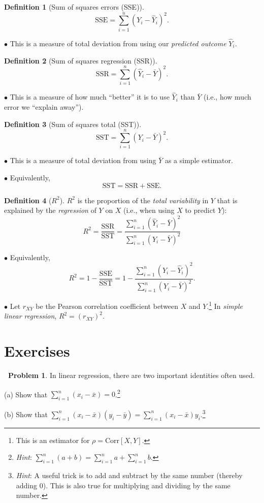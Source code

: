 \documentclass[12pt,oneside]{article}
\newcommand{\Corr}{\text{Corr}}
\newcommand{\SSE}{\text{SSE}}
\newcommand{\SST}{\text{SST}}
\newcommand{\SSR}{\text{SSR}}
\theoremstyle{definition}
\newtheorem{definition}{Definition}
\newtheorem{problem}{\faPen \ Problem}
\theoremstyle{remark}
\begin{document}
\begin{definition}[Sum of squares errors (SSE)]
\[\SSE = \sum_{i = 1}^{n} (Y_i - \hat{Y}_i)^2.\]

$\bullet$ This is a measure of total deviation from using our \textit{predicted outcome} $\hat{Y}_i$.
\end{definition}

\begin{definition}[Sum of squares regression (SSR)]
\[\SSR = \sum_{i = 1}^{n} (\hat{Y}_i - \bar{Y})^2.\]

$\bullet$ This is a measure of how much \enquote{better} it is to use $\hat{Y}_i$ than $\bar{Y}$ (i.e., how much error we \enquote{explain away}).
\end{definition}

\begin{definition}[Sum of squares total (SST)]
\[\SST = \sum_{i = 1}^{n} (Y_i - \bar{Y})^2.\]

$\bullet$ This is a measure of total deviation from using $\bar{Y}$ as a simple estimator.

$\bullet$ Equivalently, \[\SST = \SSR + \SSE.\]
\end{definition}

\begin{definition}[$R^2$]
$R^2$ is the proportion of the \textit{total variability} in $Y$ that is explained by the \textit{regression} of $Y$ on $X$ (i.e., when using $X$ to predict $Y$): \[R^2 = \frac{\SSR}{\SST} = \frac{\sum_{i = 1}^{n} (\hat{Y}_i - \bar{Y})^2}{\sum_{i = 1}^{n} (Y_i - \bar{Y})^2}\]

$\bullet$ Equivalently, \[R^2 = 1 - \frac{\SSE}{\SST} = 1 - \frac{\sum_{i = 1}^{n} (Y_i - \hat{Y}_i)^2}{\sum_{i = 1}^{n} (Y_i - \bar{Y})^2}.\]

$\bullet$ Let $r_{XY}$ be the Pearson correlation coefficient between $X$ and $Y$.\footnote{This is an estimator for $\rho = \Corr[X, Y]$.} In \textit{simple linear regression}, $R^2 = (r_{XY})^2$.
\end{definition}

\section{Exercises}

\begin{problem}
In linear regression, there are two important identities often used.

(a) Show that $\sum_{i = 1}^{n} (x_i - \bar{x}) = 0$.\footnote{\textit{Hint}: $\sum_{i = 1}^{n} (a + b) = \sum_{i = 1}^{n} a + \sum_{i = 1}^{n} b$.}

(b) Show that $\sum_{i = 1}^{n} (x_i - \bar{x}) (y_i - \bar{y}) = \sum_{i = 1}^{n} (x_i - \bar{x}) y_i$.\footnote{\textit{Hint}: A useful trick is to add and subtract by the same number (thereby adding 0). This is also true for multiplying and dividing by the same number.}
\end{problem}
\end{document}
